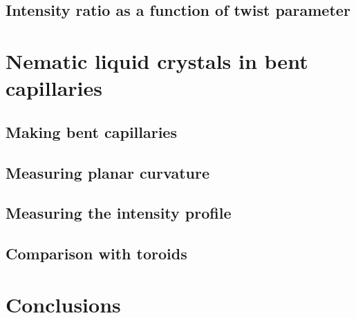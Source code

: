 \subsection{Intensity ratio as a function of twist parameter}

\section{Nematic liquid crystals in bent capillaries}
\subsection{Making bent capillaries}
\subsection{Measuring planar curvature}
\subsection{Measuring the intensity profile}
\subsection{Comparison with toroids}

\section{Conclusions}
